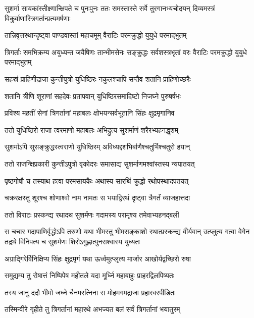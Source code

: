 \onelineshloka
{सुशर्मा सायकांस्तीक्ष्णान्क्षिपते च पुनःपुनः}
\twolineshloka
{ततः समस्तास्ते सर्वे तुरगानभ्यचोदयन्}
{दिव्यमस्त्रं विकुर्वाणास्त्रिगर्तान्प्रत्यमर्षणाः}


\twolineshloka
{तान्निवृत्तरथान्दृष्ट्वा पाण्डवास्तां महाचमूम्}
{वैराटिः परमक्रुद्धो युयुधे परमाद्भुतम्}


\threelineshloka
{त्रिगर्ताः समभिक्रम्य अयुध्यन्त जयैषिणः}
{तान्भीमसेनः सङ्क्रुद्धः सर्वशस्त्रभृतां वरः}
{वैराटिः परमक्रुद्धो युयुधे परमाद्भुतम्}


\twolineshloka
{सहस्रं प्राहिणीद्राजा कुन्तीपुत्रो युधिष्ठिरः}
{नकुलश्चापि सप्तैव शतानि प्राहिणोच्छरैः}


\twolineshloka
{शतानि त्रीणि शूराणां सहदेवः प्रतापवान्}
{युधिष्ठिरसमादिष्टो निजघ्ने पुरुषर्षभः}


\twolineshloka
{प्रविश्य महतीं सेनां त्रिगर्तानां महाबलः}
{क्षोभयन्सर्वभूतानि सिंहः क्षुद्रमृगानिव}


\twolineshloka
{ततो युधिष्ठिरो राजा त्वरमाणो महाबलः}
{अभिद्रुत्य सुशर्माणं शरैरभ्यहनद्धृशम्}


\twolineshloka
{सुशर्माऽपि सुसङ्क्रुद्धस्त्वराणो युधिष्ठिरम्}
{अविध्यद्दशभिर्बाणैश्चतुर्भिश्चतुरो हयान्}


\twolineshloka
{ततो राजन्क्षिप्रकारी कुन्तीऽपुत्रो वृकोदरः}
{समासाद्य सुशर्माणमश्वांस्तस्य न्यपातयत्}


\twolineshloka
{पृष्ठगोषौ च तस्याथ हत्वा परमसायकैः}
{अथास्य सारथिं क्रुद्धो रथोपस्थादपतयत्}


\twolineshloka
{चक्ररक्षस्तु शूरश्च शोणाश्वो नाम नामतः}
{स भयाद्विरथं दृष्ट्वा त्रैगर्तं व्याजहात्तदा}


\twolineshloka
{ततो विराटः प्रस्कन्द्य रथादथ सुशर्मणः}
{गदामस्य परामृश्य तमेवाभ्यहनद्बली}


\onelineshloka
{स चचार गदापाणिर्वृद्धोऽपि तरुणो यथा}
\threelineshloka
{भीमस्तु भीमसङ्काशो रथात्प्रस्कन्द्य वीर्यवान्}
{उत्प्लुत्य गत्वा वेगेन तद्रथे विनिपत्य च}
{सुशर्मणः शिरोऽगुह्णात्पुनराश्वास्य युध्यतः}


\twolineshloka
{अग्राद्गिरेर्विनिक्षिप्य सिंहः क्षुद्रमृगं यथा}
{ऊर्ध्वमुत्प्लृत्य मार्जार आखोर्यद्वच्छिरो रुषा}


\twolineshloka
{समुद्यम्य तु रोषात्तं निष्पिपेष महीतले}
{यदा मूर्ध्नि महाबाहुः प्राहरद्विलपिष्यतः}


\twolineshloka
{तस्य जानु ददौ भीमो जघ्ने चैनमरत्निना}
{स मोहमगमद्राजा प्रहारवरपीडितः}


\twolineshloka
{तस्मिन्वीरे गृहीते तु त्रिगर्तानां महारथे}
{अभज्यत बलं सर्वं त्रिगर्तानां भयातुरम्}


